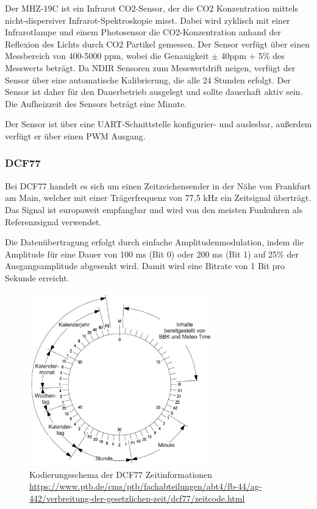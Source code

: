 \documentclass[a4paper,11pt]{article}
\begin{document}
Der MHZ-19C ist ein Infrarot CO2-Sensor, der die CO2 Konzentration mittels nicht-dispersiver Infrarot-Spektroskopie misst. Dabei wird zyklisch mit einer Infrarotlampe
und einem Photosensor die CO2-Konzentration anhand der Reflexion des Lichts durch CO2 Partikel gemessen. 
Der Sensor verfügt über einen Messbereich von 400-5000 ppm, wobei die Genauigkeit $\pm$ 40ppm + 5\% des Messwerts beträgt. 
Da NDIR Sensoren zum Messwertdrift neigen, verfügt der Sensor über eine automatische Kalibrierung, die alle 24 Stunden erfolgt. Der Sensor ist daher für den Dauerbetrieb ausgelegt
und sollte dauerhaft aktiv sein. 
Die Aufheizzeit des Sensors beträgt eine Minute. 

\noindent
Der Sensor ist über eine UART-Schnittstelle konfigurier- und auslesbar, außerdem verfügt er über einen PWM Ausgang. 

\subsubsection{DCF77}
\label{subsubsub:dcf77}

Bei DCF77 handelt es sich um einen Zeitzeichensender in der Nähe von Frankfurt am Main, welcher mit einer Trägerfrequenz von 77,5 kHz ein Zeitsignal überträgt. 
Das Signal ist europaweit empfangbar und wird von den meisten Funkuhren als Referenzsignal verwendet.  

\noindent
Die Datenübertragung erfolgt durch einfache Amplitudenmodulation, indem die Amplitude für eine Dauer von 100 ms (Bit 0) oder 200 ms (Bit 1) auf 25\% der Ausgangsamplitude abgesenkt wird. 
Damit wird eine Bitrate von 1 Bit pro Sekunde erreicht. 

\begin{figure}[H]
  \centering
  \includegraphics[width=0.7\textwidth]{dcf77Code}
  \caption{Kodierungsschema der DCF77 Zeitinformationen \\
           \url{https://www.ptb.de/cms/ptb/fachabteilungen/abt4/fb-44/ag-442/verbreitung-der-gesetzlichen-zeit/dcf77/zeitcode.html}}
  \label{fig:dcf77Schema}
\end{figure}
\end{document}
